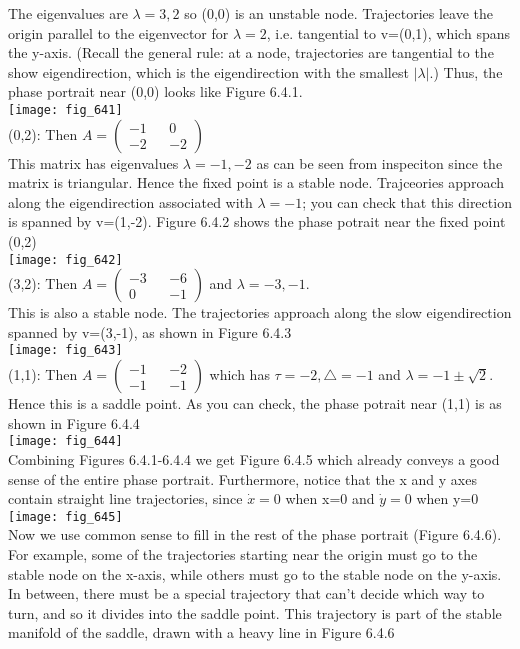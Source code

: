 \documentclass{article}
\newcommand\tab[1][1cm]{\hspace*{#1}}
\begin{document}
The eigenvalues are $\lambda = 3,2$ so (0,0) is an unstable node. Trajectories leave the origin parallel to the eigenvector for $\lambda = 2$, i.e. tangential to v=(0,1), which spans the y-axis. (Recall the general rule: at a node, trajectories are tangential to the show eigendirection, which is the eigendirection with the smallest $|\lambda|$.) Thus, the phase portrait near (0,0) looks like Figure 6.4.1. 
\\
\texttt{[image: fig\_641]}
\\ \tab
(0,2): Then $A = \begin{pmatrix} -1 && 0 \\ -2 && -2 \end{pmatrix}$ \\ 
This matrix has eigenvalues $\lambda = -1, -2$ as can be seen from inspeciton since the matrix is triangular. Hence the fixed point is a stable node. Trajceories approach along the eigendirection associated with $\lambda = -1$; you can check that this direction is spanned by v=(1,-2). Figure 6.4.2 shows the phase potrait near the fixed point (0,2) \\
\texttt{[image: fig\_642]}
 \\
(3,2): Then $A=\begin{pmatrix} -3 && -6 \\ 0 && -1 \end{pmatrix}$ and $\lambda = -3, -1$. \\ \tab
This is also a stable node. The trajectories approach along the slow eigendirection spanned by v=(3,-1), as shown in Figure 6.4.3 \\
\texttt{[image: fig\_643]} \\
(1,1): Then $A=\begin{pmatrix} -1 && -2 \\ -1 && -1 \end{pmatrix}$ which has $\tau = -2, \triangle = -1$ and $\lambda = -1 \pm \sqrt{2}$. \\
Hence this is a saddle point. As you can check, the phase potrait near (1,1) is as shown in Figure 6.4.4
\\
\texttt{[image: fig\_644]} \\
Combining Figures 6.4.1-6.4.4 we get Figure 6.4.5 which already conveys a good sense of the entire phase portrait. Furthermore, notice that the x and y axes contain straight line trajectories, since $\dot{x}=0$ when x=0 and $\dot{y}=0$ when y=0 \\
\texttt{[image: fig\_645]} \\
\tab Now we use common sense to fill in the rest of the phase portrait (Figure 6.4.6). For example, some of the trajectories starting near the origin must go to the stable node on the x-axis, while others must go to the stable node on the y-axis. In between, there must be a special trajectory that can't decide which way to turn, and so it divides into the saddle point. This trajectory is part of the stable manifold of the saddle, drawn with a heavy line in Figure 6.4.6 \\
\end{document}
